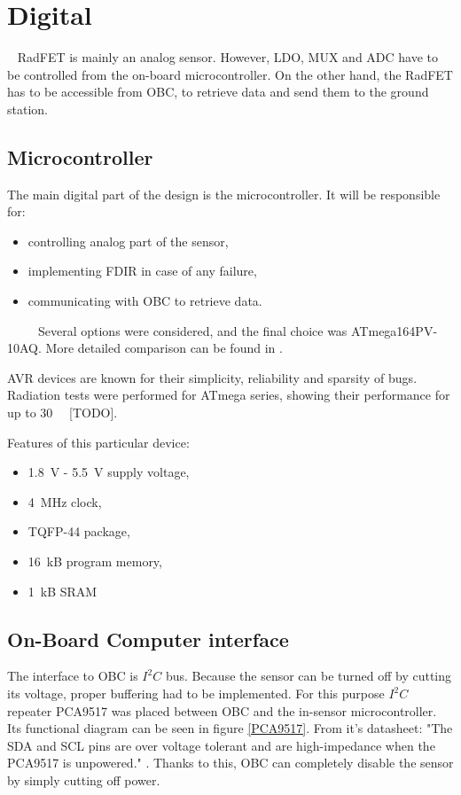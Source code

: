 \section{Digital}
    RadFET is mainly an analog sensor. However, LDO, MUX and ADC have to be controlled from the on-board microcontroller. On the other hand, the RadFET has to be accessible from OBC, to retrieve data and send them to the ground station.

    \subsection{Microcontroller}
        The main digital part of the design is the microcontroller. It will be responsible for:
        \begin{itemize}
            \item controlling analog part of the sensor,
            \item implementing FDIR in case of any failure,
            \item communicating with OBC to retrieve data.
        \end{itemize}

        Several options were considered, and the final choice was ATmega164PV-10AQ. More detailed comparison can be found in \cite{PWSAT_EPS_CDR}.

        AVR devices are known for their simplicity, reliability and sparsity of bugs. Radiation tests were performed for ATmega series, showing their performance for up to \SI{30}{\kilo\rad} [TODO].

        Features of this particular device:
        \begin{itemize}
            \item \SI{1.8}{\volt} - \SI{5.5}{\volt} supply voltage,
            \item \SI{4}{\mega\hertz} clock,
            \item TQFP-44 package,
            \item \SI{16}{\kilo B} program memory,
            \item \SI{1}{\kilo B} SRAM
        \end{itemize}

    \subsection{On-Board Computer interface}
        The interface to OBC is $I^2C$ bus. Because the sensor can be turned off by cutting its voltage, proper buffering had to be implemented. For this purpose $I^2C$ repeater PCA9517 was placed between OBC and the in-sensor microcontroller. Its functional diagram can be seen in figure \ref{PCA9517}. From it's datasheet: "The SDA and SCL pins are over voltage tolerant and are high-impedance when the PCA9517 is unpowered." \cite{PCA9517_datasheet}. Thanks to this, OBC can completely disable the sensor by simply cutting off power.

